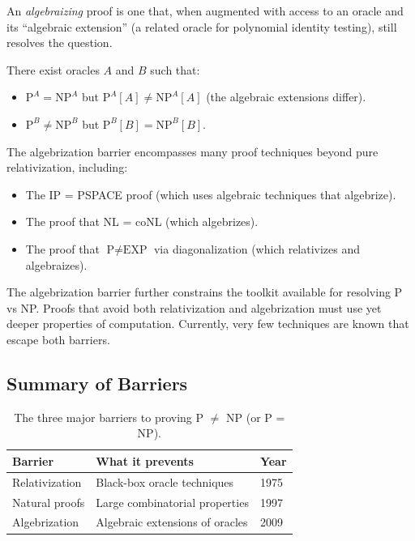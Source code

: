 An \emph{algebraizing} proof is one that, when augmented with access to an oracle and its ``algebraic extension'' (a related oracle for polynomial identity testing), still resolves the question.

\begin{theorem}
There exist oracles $A$ and $B$ such that:
\begin{itemize}
  \item $\text{P}^{A} = \text{NP}^{A}$ but $\text{P}^{A}[A] \neq \text{NP}^{A}[A]$ (the algebraic extensions differ).
  \item $\text{P}^{B} \neq \text{NP}^{B}$ but $\text{P}^{B}[B] = \text{NP}^{B}[B]$.
\end{itemize}
\end{theorem}

The algebrization barrier encompasses many proof techniques beyond pure relativization, including:
\begin{itemize}
  \item The IP = PSPACE proof (which uses algebraic techniques that algebrize).
  \item The proof that NL = coNL (which algebrizes).
  \item The proof that $\text{P} \neq \text{EXP}$ via diagonalization (which relativizes and algebraizes).
\end{itemize}

\begin{remark}
The algebrization barrier further constrains the toolkit available for resolving P vs NP. Proofs that avoid both relativization and algebrization must use yet deeper properties of computation. Currently, very few techniques are known that escape both barriers.
\end{remark}

\subsection{Summary of Barriers}

\begin{table}[ht]
\centering
\begin{tabular}{lll}
\toprule
\textbf{Barrier} & \textbf{What it prevents} & \textbf{Year} \\
\midrule
Relativization & Black-box oracle techniques & 1975 \\
Natural proofs & Large combinatorial properties & 1997 \\
Algebrization & Algebraic extensions of oracles & 2009 \\
\bottomrule
\end{tabular}
\caption{The three major barriers to proving P $\neq$ NP (or P = NP).}
\label{tab:barriers}
\end{table}

